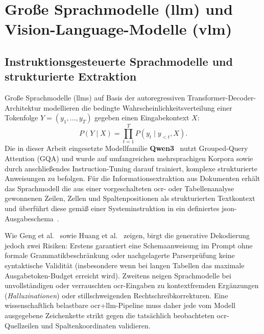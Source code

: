 \section{Große Sprachmodelle (\texorpdfstring{\acs{llm}}{LLM}) und Vision-Language-Modelle (\texorpdfstring{\acs{vlm}}{VLM})}
\label{sec:llm-vlm}

\subsection{Instruktionsgesteuerte Sprachmodelle und strukturierte Extraktion}
\label{subsec:llm-grundlagen}

Große Sprachmodelle (\acp{llm}) auf Basis der autoregressiven Transformer-Decoder-Architektur modellieren die bedingte Wahrscheinlichkeitsverteilung einer Tokenfolge $Y = (y_1, \ldots, y_T)$ gegeben einen Eingabekontext $X$:
\begin{equation}
  P(Y \mid X) = \prod_{t=1}^{T} P(y_t \mid y_{<t}, X).
  \label{eq:llm-autoregressive}
\end{equation}
Die in dieser Arbeit eingesetzte Modellfamilie \textbf{Qwen3}~\cite{Yang2025Qwen3,QwenSelectionTextCard} nutzt Grouped-Query Attention (GQA) und wurde auf umfangreichen mehrsprachigen Korpora sowie durch anschließendes Instruction-Tuning darauf trainiert, komplexe strukturierte Anweisungen zu befolgen. Für die Informationsextraktion aus Dokumenten erhält das Sprachmodell die aus einer vorgeschalteten \ac{ocr}- oder Tabellenanalyse gewonnenen Zeilen, Zellen und Spaltenpositionen als strukturierten Textkontext und überführt diese gemäß einer Systeminstruktion in ein definiertes \ac{json}-Ausgabeschema~\cite{Schulhoff2025PromptReport,Wang2023InstructUIE,Sainz2024GoLLIE}.

Wie Geng et al.~\cite{Geng2023Grammar} sowie Huang et al.~\cite{Huang2024Hallucination} zeigen, birgt die generative Dekodierung jedoch zwei Risiken: Erstens garantiert eine Schemaanweisung im Prompt ohne formale Grammatikbeschränkung oder nachgelagerte Parserprüfung keine syntaktische Validität (insbesondere wenn bei langen Tabellen das maximale Ausgabetoken-Budget erreicht wird). Zweitens neigen Sprachmodelle bei unvollständigen oder verrauschten \ac{ocr}-Eingaben zu kontextfremden Ergänzungen (\emph{Halluzinationen}) oder stillschweigenden Rechtschreibkorrekturen. Eine wissenschaftlich belastbare \ac{ocr}+\ac{llm}-Pipeline muss daher jede vom Modell ausgegebene Zeichenkette strikt gegen die tatsächlich beobachteten \ac{ocr}-Quellzeilen und Spaltenkoordinaten validieren.

